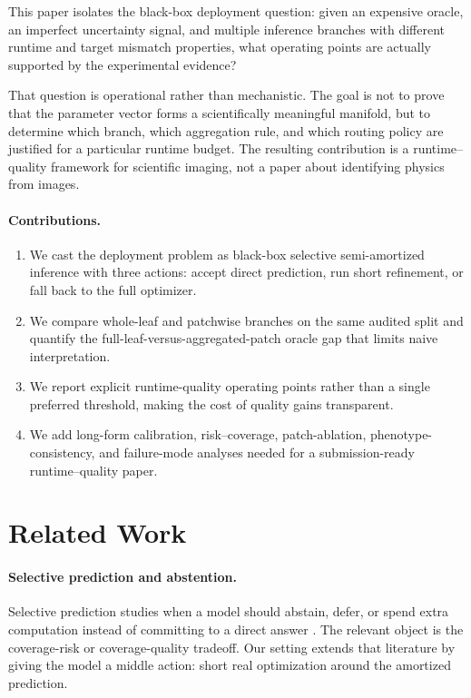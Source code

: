 \documentclass[11pt,a4paper]{article}
\begin{document}
This paper isolates the black-box deployment question: given an expensive oracle, an imperfect uncertainty signal, and multiple inference branches with different runtime and target mismatch properties, what operating points are actually supported by the experimental evidence?

That question is operational rather than mechanistic.
The goal is not to prove that the parameter vector forms a scientifically meaningful manifold, but to determine which branch, which aggregation rule, and which routing policy are justified for a particular runtime budget.
The resulting contribution is a runtime--quality framework for scientific imaging, not a paper about identifying physics from images.

\paragraph{Contributions.}
\begin{enumerate}[leftmargin=1.5em,itemsep=2pt]
\item We cast the deployment problem as black-box selective semi-amortized inference with three actions: accept direct prediction, run short refinement, or fall back to the full optimizer.
\item We compare whole-leaf and patchwise branches on the same audited split and quantify the full-leaf-versus-aggregated-patch oracle gap that limits naive interpretation.
\item We report explicit runtime-quality operating points rather than a single preferred threshold, making the cost of quality gains transparent.
\item We add long-form calibration, risk--coverage, patch-ablation, phenotype-consistency, and failure-mode analyses needed for a submission-ready runtime--quality paper.
\end{enumerate}

\section{Related Work}
\paragraph{Selective prediction and abstention.}
Selective prediction studies when a model should abstain, defer, or spend extra computation instead of committing to a direct answer \citep{B_elyaniv2010,B_geifman2017,B_geifman2019}.
The relevant object is the coverage-risk or coverage-quality tradeoff.
Our setting extends that literature by giving the model a middle action: short real optimization around the amortized prediction.
\end{document}
